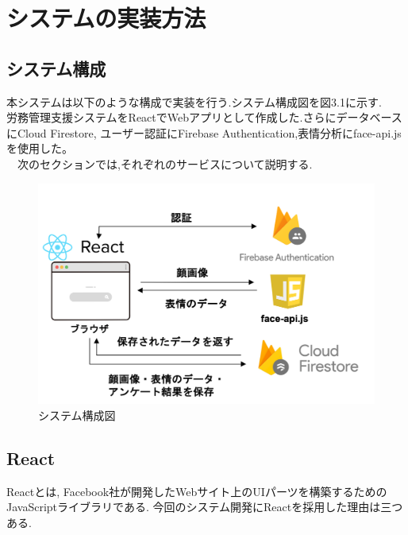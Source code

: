 \chapter{システムの実装方法}
\label{chp:reference}

\section{システム構成}
\label{sec:reference_ftnote}
本システムは以下のような構成で実装を行う.システム構成図を図3.1に示す.\\
労務管理支援システムをReactでWebアプリとして作成した.さらにデータベースにCloud Firestore,
ユーザー認証にFirebase Authentication,表情分析にface-api.jsを使用した。\\
　次のセクションでは,それぞれのサービスについて説明する.

\begin{figure}[!h]
	\begin{center}
			\includegraphics[scale=1.2, clip]{./img/compose.png}
			\caption{システム構成図}
			\label{fig:図の名前}
	\end{center}
\end{figure}


\section{React}
\label{sec:reference_quote}
	Reactとは, Facebook社が開発したWebサイト上のUIパーツを構築するためのJavaScriptライブラリである.
	今回のシステム開発にReactを採用した理由は三つある.

